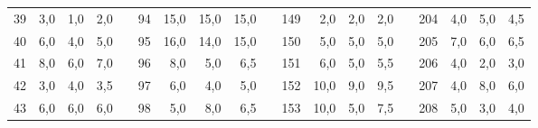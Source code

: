 \begin{table}[H]
{\begin{tabular}{|c|r|r|r|l|c|r|r|r|l|c|r|r|r|lcrrr}
39                                                    & 3,0                                                                       & 1,0                                                                       & 2,0                                                                       &  & 94  & 15,0 & 15,0 & 15,0 &  & 149 & 2,0  & 2,0  & 2,0  & \multicolumn{1}{l|}{} & \multicolumn{1}{c|}{204} & \multicolumn{1}{r|}{4,0}  & \multicolumn{1}{r|}{5,0}  & \multicolumn{1}{r|}{4,5}  \\ \cline{1-4} \cline{6-9} \cline{11-14} \cline{16-19} 
40                                                    & 6,0                                                                       & 4,0                                                                       & 5,0                                                                       &  & 95  & 16,0 & 14,0 & 15,0 &  & 150 & 5,0  & 5,0  & 5,0  & \multicolumn{1}{l|}{} & \multicolumn{1}{c|}{205} & \multicolumn{1}{r|}{7,0}  & \multicolumn{1}{r|}{6,0}  & \multicolumn{1}{r|}{6,5}  \\ \cline{1-4} \cline{6-9} \cline{11-14} \cline{16-19} 
41                                                    & 8,0                                                                       & 6,0                                                                       & 7,0                                                                       &  & 96  & 8,0  & 5,0  & 6,5  &  & 151 & 6,0  & 5,0  & 5,5  & \multicolumn{1}{l|}{} & \multicolumn{1}{c|}{206} & \multicolumn{1}{r|}{4,0}  & \multicolumn{1}{r|}{2,0}  & \multicolumn{1}{r|}{3,0}  \\ \cline{1-4} \cline{6-9} \cline{11-14} \cline{16-19} 
42                                                    & 3,0                                                                       & 4,0                                                                       & 3,5                                                                       &  & 97  & 6,0  & 4,0  & 5,0  &  & 152 & 10,0 & 9,0  & 9,5  & \multicolumn{1}{l|}{} & \multicolumn{1}{c|}{207} & \multicolumn{1}{r|}{4,0}  & \multicolumn{1}{r|}{8,0}  & \multicolumn{1}{r|}{6,0}  \\ \cline{1-4} \cline{6-9} \cline{11-14} \cline{16-19} 
43                                                    & 6,0                                                                       & 6,0                                                                       & 6,0                                                                       &  & 98  & 5,0  & 8,0  & 6,5  &  & 153 & 10,0 & 5,0  & 7,5  & \multicolumn{1}{l|}{} & \multicolumn{1}{c|}{208} & \multicolumn{1}{r|}{5,0}  & \multicolumn{1}{r|}{3,0}  & \multicolumn{1}{r|}{4,0}  \\ \cline{1-4} \cline{6-9} \cline{11-14} \cline{16-19} 

\end{tabular}}
\end{table}

